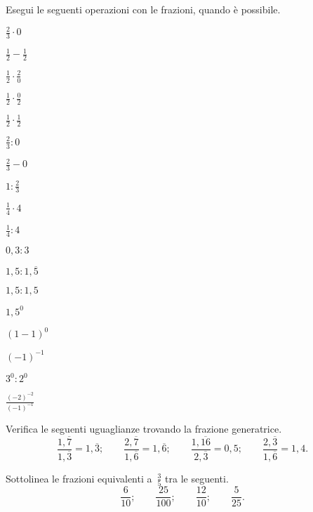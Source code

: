 \begin{esercizio}
Esegui le seguenti operazioni con le frazioni, quando è possibile.
\begin{multicols}{4}
\begin{enumeratea}
\spazielenx
\item \(\displaystyle{\frac{2}{3}\cdot0}\)
\item \(\displaystyle{\frac{1}{2}-\frac{1}{2}}\)
\item \(\displaystyle{\frac{1}{2}\cdot\frac{2}{0}}\)
\item \(\displaystyle{\frac{1}{2}}\cdot\frac{0}{2}\)
\item \(\displaystyle{\frac{1}{2}\cdot\frac{1}{2}}\)
\item \(\displaystyle{\frac{2}{3}:0}\)
\item \(\displaystyle{\frac{2}{3}-0}\)
\item \(\displaystyle{1:\frac{2}{3}}\)
\item \(\displaystyle{\frac{1}{4}\cdot4}\)
\item \(\displaystyle{\frac{1}{4}:4}\)
\item \(0,3:3\)
\item \(\displaystyle{1,5:1,\overline{5}}\)
\item \(1,5:1,5\)
\item \(1,5^0\)
\item \((1-1)^0\)
\item \((-1)^{-1}\)
\item \(3^0:2^0\)
\item \(\frac{(-2)^{-2}}{(-1)^{-1}}\)
\end{enumeratea}
\end{multicols}
\end{esercizio}

\begin{esercizio}
Verifica le seguenti uguaglianze trovando la frazione generatrice.
\[\frac{1,\overline{7}}{1,\overline{3}}=1,\overline{3};\qquad%
\frac{2,\overline{7}}{1,\overline{6}}=1,\overline{6};\qquad%
\frac{1,\overline{16}}{2,\overline{3}}=0,5;\qquad%
\frac{2,\overline{3}}{1,\overline{6}}=1,4.\]
\end{esercizio}


\begin{esercizio}
Sottolinea le frazioni equivalenti a~\(\frac{3}{5}\) tra le seguenti.
\[\frac{6}{10};\qquad\frac{25}{100};\qquad\frac{12}{10};\qquad\frac{5}{25}.\]
\end{esercizio}


